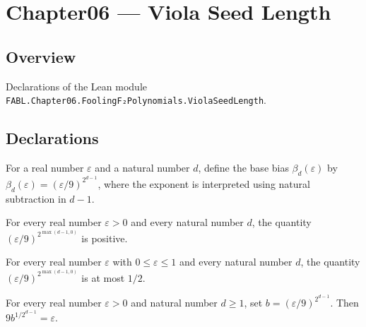 \chapter{Chapter06 — Viola Seed Length}
\section{Overview}

Declarations of the Lean module \texttt{FABL.Chapter06.FoolingF₂Polynomials.ViolaSeedLength}.

\section{Declarations}

\begin{definition}
\label{FABL.violaBaseBias}
\leanok
For a real number $\varepsilon$ and a natural number $d$, define the base bias
$\beta_d(\varepsilon)$ by $\beta_d(\varepsilon)=(\varepsilon/9)^{2^{d-1}}$, where the
exponent is interpreted using natural subtraction in $d-1$.
\end{definition}

\begin{theorem}
\label{FABL.violaBaseBias_pos}
\leanok
{}
For every real number $\varepsilon>0$ and every natural number $d$, the quantity
$(\varepsilon/9)^{2^{\max(d-1,0)}}$ is positive.
\end{theorem}

\begin{theorem}
\label{FABL.violaBaseBias_le_half}
\leanok
{}
For every real number $\varepsilon$ with $0\le\varepsilon\le1$ and every natural number
$d$, the quantity $(\varepsilon/9)^{2^{\max(d-1,0)}}$ is at most $1/2$.
\end{theorem}

\begin{theorem}
\label{FABL.violaError_baseBias}
\leanok
{}
For every real number $\varepsilon>0$ and natural number $d\ge1$, set
$b=(\varepsilon/9)^{2^{d-1}}$. Then $9b^{1/2^{d-1}}=\varepsilon$.
\end{theorem}

